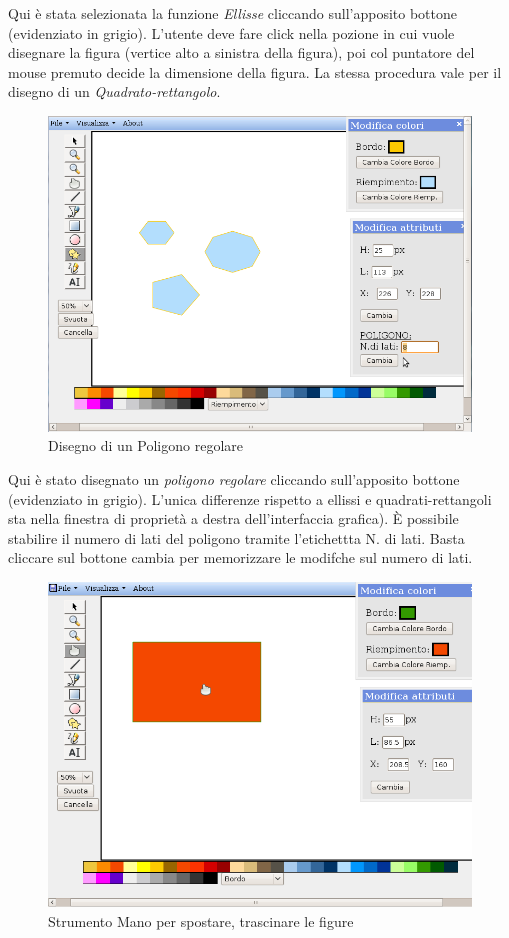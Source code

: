 \vspace{100pt}
Qui \`e stata selezionata la funzione \textit{Ellisse}  cliccando sull'apposito bottone (evidenziato in grigio). L'utente deve fare click nella pozione in cui vuole disegnare la figura (vertice alto a sinistra della figura), poi col puntatore del mouse premuto decide la dimensione della figura. La stessa procedura vale per il disegno di un \textit{Quadrato-rettangolo}.

\begin{figure}[!ht]
\centering
\includegraphics[scale=0.4]{images/poligono.png}
\caption{Disegno di un Poligono regolare}
\end{figure} 

\vspace{300pt}
Qui \`e stato disegnato un \textit{poligono regolare}  cliccando sull'apposito bottone (evidenziato in grigio). L'unica differenze rispetto a ellissi e quadrati-rettangoli sta nella finestra di propriet\`a a destra dell'interfaccia grafica). \`E possibile stabilire il numero di lati del poligono tramite l'etichettta N. di lati. Basta cliccare sul bottone cambia per memorizzare le modifche sul numero di lati.

\begin{figure}[!ht]
\centering
\includegraphics[scale=0.4]{images/mano.png}
\caption{Strumento Mano per spostare, trascinare le figure}
\end{figure} 

